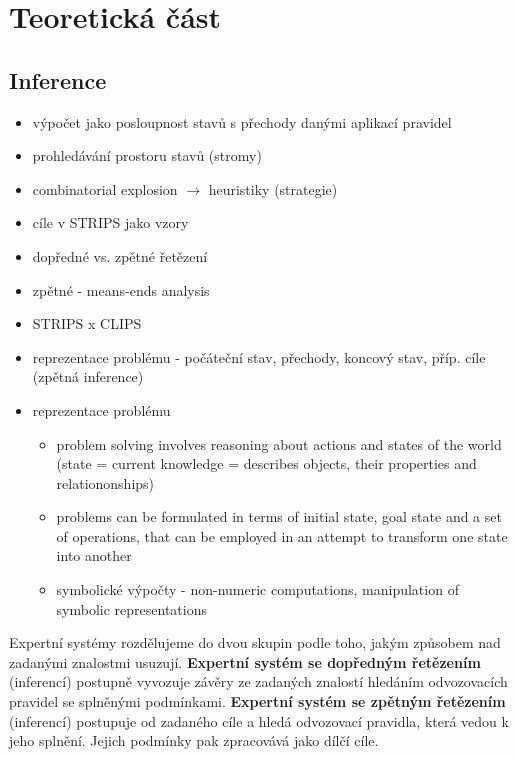 \section{Teoretická část}




\subsection{Inference}
\begin{framed}
  \begin{itemize}
    \item výpočet jako posloupnost stavů s přechody danými aplikací pravidel
    \item prohledávání prostoru stavů (stromy)
    \item combinatorial explosion $\rightarrow$ heuristiky (strategie)
    \item cíle v STRIPS jako vzory
    \item dopředné vs. zpětné řetězení
    \item zpětné - means-ends analysis
    \item STRIPS x CLIPS
    \item reprezentace problému - počáteční stav, přechody, koncový stav,
      příp. cíle (zpětná inference)
    \item reprezentace problému
      \begin{itemize}
        \item problem solving involves reasoning about actions and states of the
          world (state = current knowledge = describes objects, their properties and
          relationonships)
        \item problems can be formulated in terms of initial state, goal state
          and a set of operations, that can be employed in an attempt to
          transform one state into another
        \item symbolické výpočty - non-numeric computations, manipulation of
          symbolic representations
      \end{itemize}
  \end{itemize}
\end{framed}

Expertní systémy rozdělujeme do dvou skupin podle toho, jakým způsobem nad
zadanými znalostmi usuzují. \textbf{Expertní systém se dopředným řetězením}
(inferencí) postupně vyvozuje závěry ze zadaných znalostí hledáním odvozovacích
pravidel se splněnými podmínkami. \textbf{Expertní systém se zpětným řetězením}
(inferencí) postupuje od zadaného cíle a hledá odvozovací pravidla, která vedou
k jeho splnění. Jejich podmínky pak zpracovává jako dílčí cíle.

